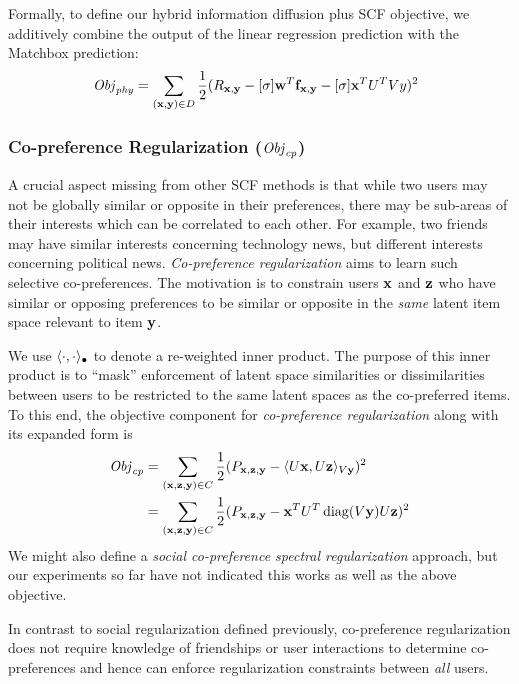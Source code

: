 Formally, to define our hybrid information diffusion plus SCF objective,
we additively combine the output of the linear regression prediction with the
Matchbox prediction:
\begin{align}
\sqm \Obj_\phy = \sum_{(\x,\y) \in D} \frac{1}{2} (R_{\x,\y} - [\sigma] \w^T \f_{\x,\y} - [\sigma] \x^T U^T V y)^2 
\end{align}

\subsubsection{Co-preference Regularization ($\mathit{Obj}_{\mathit{cp}}$)}
\label{sec:rsc}

A crucial aspect missing from other SCF methods is that while two
users may not be globally similar or opposite in their preferences,
there may be sub-areas of their interests which can be correlated to
each other.  For example, two friends may have similar interests
concerning technology news, but different interests concerning
political news.  \emph{Co-preference regularization} aims to learn
such selective co-preferences.  The motivation is to constrain users
$\mathbf{x}$ and $\mathbf{z}$ who have similar or opposing preferences to be similar
or opposite in the \emph{same} latent item space relevant to item $\mathbf{y}$.

We use $\langle \cdot, \cdot \rangle_{\bullet}$ to denote a re-weighted inner
product. The purpose of this inner product is to ``mask'' enforcement
of latent space similarities or dissimilarities between users to be restricted
to the same latent spaces as the co-preferred items.  To this end, the
objective component for \emph{co-preference regularization} 
along with its expanded form is
\begin{align}
\mathit{Obj}_{\mathit{cp}} & = \sum_{(\mathbf{x},\mathbf{z},\mathbf{y}) \in C} \frac{1}{2} (P_{\mathbf{x},\mathbf{z},\mathbf{y}} - \langle U\mathbf{x}, U\mathbf{z} \rangle_{V\mathbf{y}})^2 \\
& = \sum_{(\mathbf{x},\mathbf{z},\mathbf{y}) \in C} \frac{1}{2} (P_{\mathbf{x},\mathbf{z},\mathbf{y}} - \mathbf{x}^T U^T \operatorname{diag}(V\mathbf{y}) U \mathbf{z})^2 \nonumber
\end{align}
We might also define a \emph{social co-preference spectral
regularization} approach, but our experiments so far have not indicated
this works as well as the above objective.  

In contrast to social regularization
defined previously, co-preference regularization does not require knowledge
of friendships or user interactions to determine co-preferences and hence
can enforce regularization constraints between \emph{all} users.

